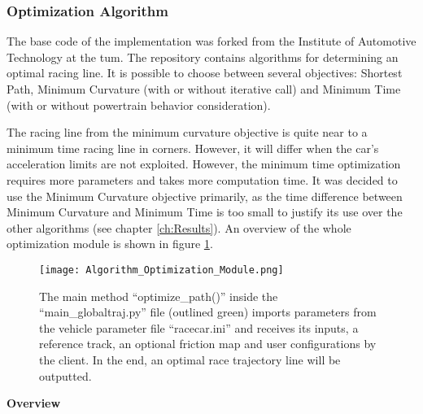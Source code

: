 \subsubsection{Optimization Algorithm} \label{sec:Optimization Algorithm}
The base code of the implementation was forked from the Institute of Automotive Technology at the \acrlong{tum}.
The repository contains algorithms for determining an optimal racing line. It is possible to choose between several objectives: Shortest Path, Minimum Curvature (with or without iterative call) and Minimum Time (with or without powertrain behavior consideration). \cite{tumftm_optimization_algoritm}

The racing line from the minimum curvature objective is quite near to a minimum time racing line in corners. However, it will differ when the car's acceleration limits are not exploited. However, the minimum time optimization requires more parameters and takes more computation time. It was decided to use the Minimum Curvature objective primarily, as the time difference between Minimum Curvature and Minimum Time is too small to justify its use over the other algorithms (see chapter \ref{ch:Results}). An overview of the whole optimization module is shown in figure \ref{fig:Optimization Algorithm Module Overview}.
\begin{figure}[H]
    \centering
    \texttt{[image: Algorithm\_Optimization\_Module.png]}
    \caption{The main method ``optimize\_path()'' inside the ``main\_globaltraj.py'' file (outlined green) imports parameters from the vehicle parameter file ``racecar.ini'' and receives its inputs, a reference track, an optional friction map and user configurations by the client. In the end, an optimal race trajectory line will be outputted.}
    \label{fig:Optimization Algorithm Module Overview}
\end{figure}

\textbf{Overview}

